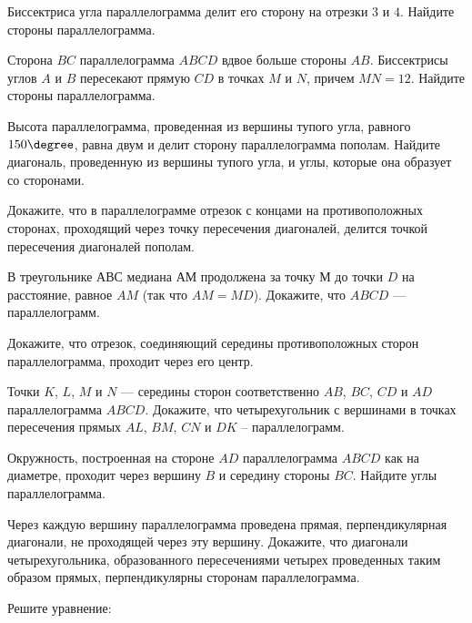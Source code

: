 %
%
\begin{class}[number=6]
	\begin{listofex}
			\item Биссектриса угла параллелограмма делит его сторону на отрезки \( 3 \) и \( 4 \).
			Найдите стороны параллелограмма.
			\item Сторона \( BC \) параллелограмма \( ABCD \) вдвое больше стороны \( AB \).
			Биссектрисы углов \( A \) и \( B \) пересекают прямую \( CD \) в точках \( M \) и \( N \), причем \( MN=12 \).
			Найдите стороны параллелограмма.
			\item Высота параллелограмма, проведенная из вершины тупого угла,
			равного \( 150\degree \), равна двум и делит сторону
			параллелограмма пополам. Найдите диагональ,
			проведенную из вершины тупого угла, и углы,
			которые она образует со сторонами.
		
		\item Докажите, что в параллелограмме отрезок с концами на противоположных сторонах, проходящий через точку пересечения диагоналей, делится точкой пересечения диагоналей пополам.
		\item В треугольнике \( АВС \) медиана \( АМ \) продолжена за точку \( М \) до точки \( D \) на расстояние, равное \( AM \) (так что \( AM=MD\)). Докажите, что \( ABCD \) --- параллелограмм.
		\item Докажите, что отрезок, соединяющий середины противоположных сторон параллелограмма, проходит через его центр.
		\item Точки \( K \), \( L \), \( M \) и \( N \) --- середины сторон соответственно \( AB \), \( BC \), \( CD \) и \( AD \) параллелограмма \( ABCD \). Докажите, что четырехугольник с вершинами в точках пересечения прямых \( AL \), \( BM \), \( CN \) и \( DK \) -- параллелограмм.
		\item Окружность, построенная на стороне \( AD \) параллелограмма \( ABCD \) как на диаметре, проходит через вершину \( B \) и середину стороны \( BC \). Найдите углы параллелограмма.
		\item Через каждую вершину параллелограмма проведена прямая, перпендикулярная диагонали, не проходящей через эту вершину. Докажите, что диагонали четырехугольника, образованного пересечениями четырех проведенных таким образом прямых, перпендикулярны сторонам параллелограмма.
		\item Решите уравнение:
		\begin{itasks}[4]
			\task {}
			\task {}
			\task {}
			\task {}
		\end{itasks}
	\end{listofex}
\end{class}
